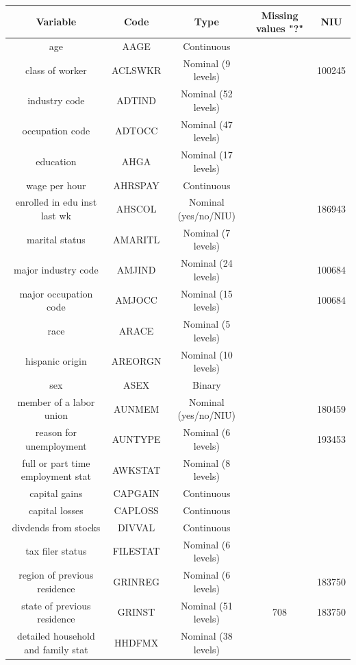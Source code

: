 \documentclass{article}
\begin{document}
\begin{center}
\begin{tabular}{|c|c|c|c|c|}
\hline
 \textbf{Variable} & \textbf{Code} & \textbf{Type} & \textbf{Missing values "?"} & \textbf{NIU}\\
 \hline
 age & AAGE & Continuous & &\\
 \hline
 class of worker & ACLSWKR & Nominal (9 levels) & & 100245\\
 \hline
 industry code & ADTIND & Nominal (52 levels) & & \\
 \hline
 occupation code & ADTOCC & Nominal (47 levels) & &\\
 \hline
 education & AHGA & Nominal (17 levels) & &\\
 \hline
 wage per hour & AHRSPAY & Continuous & &\\
 \hline
 enrolled in edu inst last wk & AHSCOL & Nominal (yes/no/NIU) & & 186943\\
 \hline
 marital status	& AMARITL & Nominal (7 levels) & &\\
 \hline
 major industry code & AMJIND & Nominal (24 levels) & & 100684\\
 \hline
 major occupation code	& AMJOCC & Nominal (15 levels) & & 100684 \\
 \hline
 race	& ARACE & Nominal (5 levels) & &\\
 \hline
 hispanic origin & AREORGN & Nominal (10 levels) & &\\
 \hline
 sex & ASEX & Binary & &\\
\hline
 member of a labor union & AUNMEM & Nominal (yes/no/NIU) & & 180459\\
\hline
 reason for unemployment & AUNTYPE & Nominal (6 levels) & & 193453\\
\hline
 full or part time employment stat & AWKSTAT & Nominal (8 levels) & &\\
\hline
 capital gains & CAPGAIN& Continuous & &\\
\hline
 capital losses & CAPLOSS & Continuous & &\\
\hline 
 divdends from stocks & DIVVAL & Continuous & & \\
\hline
 tax filer status & FILESTAT & Nominal (6 levels) & &\\
\hline
 region of previous residence & GRINREG & Nominal (6 levels) & & 183750\\
\hline
 state of previous residence & GRINST & Nominal (51 levels) & 708 & 183750\\
\hline
 detailed household and family stat & HHDFMX & Nominal (38 levels) & &\\

\end{tabular}
\end{center}
\end{document}

